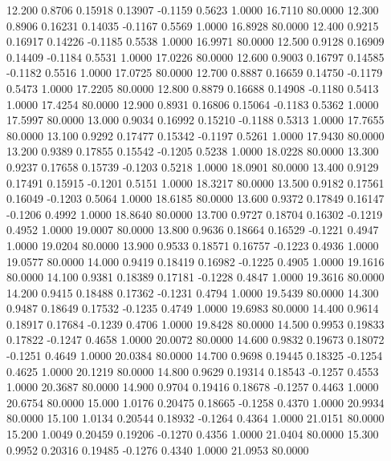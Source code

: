   12.200   0.8706   0.15918   0.13907  -0.1159   0.5623   1.0000  16.7110  80.0000
  12.300   0.8906   0.16231   0.14035  -0.1167   0.5569   1.0000  16.8928  80.0000
  12.400   0.9215   0.16917   0.14226  -0.1185   0.5538   1.0000  16.9971  80.0000
  12.500   0.9128   0.16909   0.14409  -0.1184   0.5531   1.0000  17.0226  80.0000
  12.600   0.9003   0.16797   0.14585  -0.1182   0.5516   1.0000  17.0725  80.0000
  12.700   0.8887   0.16659   0.14750  -0.1179   0.5473   1.0000  17.2205  80.0000
  12.800   0.8879   0.16688   0.14908  -0.1180   0.5413   1.0000  17.4254  80.0000
  12.900   0.8931   0.16806   0.15064  -0.1183   0.5362   1.0000  17.5997  80.0000
  13.000   0.9034   0.16992   0.15210  -0.1188   0.5313   1.0000  17.7655  80.0000
  13.100   0.9292   0.17477   0.15342  -0.1197   0.5261   1.0000  17.9430  80.0000
  13.200   0.9389   0.17855   0.15542  -0.1205   0.5238   1.0000  18.0228  80.0000
  13.300   0.9237   0.17658   0.15739  -0.1203   0.5218   1.0000  18.0901  80.0000
  13.400   0.9129   0.17491   0.15915  -0.1201   0.5151   1.0000  18.3217  80.0000
  13.500   0.9182   0.17561   0.16049  -0.1203   0.5064   1.0000  18.6185  80.0000
  13.600   0.9372   0.17849   0.16147  -0.1206   0.4992   1.0000  18.8640  80.0000
  13.700   0.9727   0.18704   0.16302  -0.1219   0.4952   1.0000  19.0007  80.0000
  13.800   0.9636   0.18664   0.16529  -0.1221   0.4947   1.0000  19.0204  80.0000
  13.900   0.9533   0.18571   0.16757  -0.1223   0.4936   1.0000  19.0577  80.0000
  14.000   0.9419   0.18419   0.16982  -0.1225   0.4905   1.0000  19.1616  80.0000
  14.100   0.9381   0.18389   0.17181  -0.1228   0.4847   1.0000  19.3616  80.0000
  14.200   0.9415   0.18488   0.17362  -0.1231   0.4794   1.0000  19.5439  80.0000
  14.300   0.9487   0.18649   0.17532  -0.1235   0.4749   1.0000  19.6983  80.0000
  14.400   0.9614   0.18917   0.17684  -0.1239   0.4706   1.0000  19.8428  80.0000
  14.500   0.9953   0.19833   0.17822  -0.1247   0.4658   1.0000  20.0072  80.0000
  14.600   0.9832   0.19673   0.18072  -0.1251   0.4649   1.0000  20.0384  80.0000
  14.700   0.9698   0.19445   0.18325  -0.1254   0.4625   1.0000  20.1219  80.0000
  14.800   0.9629   0.19314   0.18543  -0.1257   0.4553   1.0000  20.3687  80.0000
  14.900   0.9704   0.19416   0.18678  -0.1257   0.4463   1.0000  20.6754  80.0000
  15.000   1.0176   0.20475   0.18665  -0.1258   0.4370   1.0000  20.9934  80.0000
  15.100   1.0134   0.20544   0.18932  -0.1264   0.4364   1.0000  21.0151  80.0000
  15.200   1.0049   0.20459   0.19206  -0.1270   0.4356   1.0000  21.0404  80.0000
  15.300   0.9952   0.20316   0.19485  -0.1276   0.4340   1.0000  21.0953  80.0000
